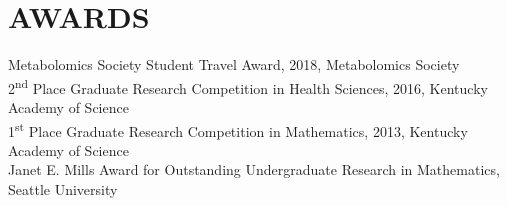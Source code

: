 {\section*{AWARDS}
Metabolomics Society Student Travel Award, 2018, Metabolomics Society\\

2\textsuperscript{nd} Place Graduate Research Competition in Health Sciences, 2016, Kentucky Academy of Science\\

1\textsuperscript{st} Place Graduate Research Competition in Mathematics, 2013, Kentucky Academy of Science\\

Janet E. Mills Award for Outstanding Undergraduate Research in Mathematics, Seattle University

}